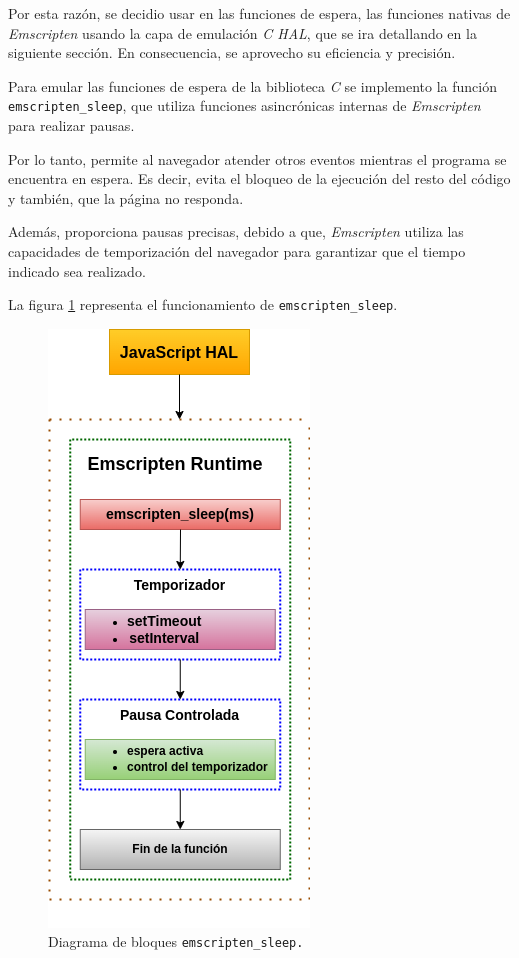 Por esta razón, se decidio usar en las funciones de espera,  las funciones nativas de \textit{Emscripten} usando la capa de emulación \textit{C HAL}, que se ira detallando en la siguiente sección. En consecuencia, se aprovecho su eficiencia y precisión.

Para emular las funciones de espera de la biblioteca \textit{C} se implemento la función \texttt{emscripten\_sleep}, que utiliza funciones asincrónicas internas de \textit{Emscripten} para realizar pausas. 

Por lo tanto, permite al navegador atender otros eventos mientras el programa se encuentra en espera. Es decir, evita el bloqueo de la ejecución del resto del código y también, que la página no responda.

Además, proporciona pausas precisas, debido a que, \textit{Emscripten}  utiliza las capacidades de temporización del navegador para garantizar que el tiempo indicado sea realizado.

La figura \ref{fig:emscriptenDelay} representa el funcionamiento de  \texttt{emscripten\_sleep}. 


\begin{figure}[ht]
	\centering
	\includegraphics[scale=.50]{./Figures/emscriptenDelay.png}
	\caption{Diagrama de bloques \texttt{emscripten\_sleep.}}
	\label{fig:emscriptenDelay}
\end{figure}




